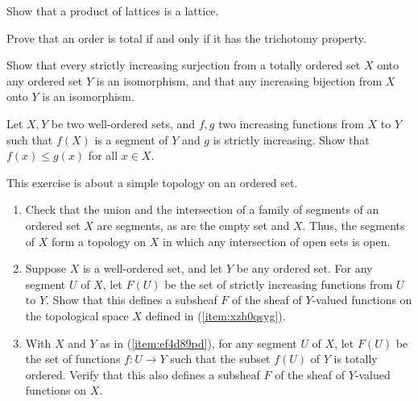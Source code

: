 \documentclass{article}
\begin{document}
\begin{exercise}
  \label{exe:yowl3axc}
  Show that a product of lattices is a lattice.
\end{exercise}

\begin{exercise}
  \label{exe:4knqif5b}
  Prove that an order is total if and only if it has the trichotomy
  property.
\end{exercise}

\begin{exercise}
  \label{exe:v1tw1ijd}
  Show that every strictly increasing surjection from a totally
  ordered set \(X\) onto any ordered set \(Y\) is an isomorphism, and
  that any increasing bijection from \(X\) onto \(Y\) is an
  isomorphism.
\end{exercise}

\begin{exercise}
  \label{exe:gsdhavsp}
  Let \(X, Y\) be two well-ordered sets, and \(f, g\) two increasing
  functions from \(X\) to \(Y\) such that \(f(X)\) is a segment of
  \(Y\) and \(g\) is strictly increasing.  Show that
  \(f(x) \leq g(x)\) for all \(x \in X\).
\end{exercise}

\begin{exercise}
  \label{exe:rpm18mof}
  This exercise is about a simple topology on an ordered set.
  \begin{enumerate}
  \item \label{item:xzh0qsyg} Check that the union and the
    intersection of a family of segments of an ordered set \(X\) are
    segments, as are the empty set and \(X\).  Thus, the segments of
    \(X\) form a topology on \(X\) in which any intersection of open
    sets is open.
  \item \label{item:ef4d89pd} Suppose \(X\) is a well-ordered set, and
    let \(Y\) be any ordered set.  For any segment \(U\) of \(X\), let
    \(F(U)\) be the set of strictly increasing functions from \(U\) to
    \(Y\).  Show that this defines a subsheaf \(F\) of the sheaf of
    \(Y\)-valued functions on the topological space \(X\) defined in
    (\ref{item:xzh0qsyg}).
  \item With \(X\) and \(Y\) as in (\ref{item:ef4d89pd}), for any
    segment \(U\) of \(X\), let \(F(U)\) be the set of functions
    \(f : U \to Y\) such that the subset \(f(U)\) of \(Y\) is totally
    ordered.  Verify that this also defines a subsheaf \(F\) of the
    sheaf of \(Y\)-valued functions on \(X\).
  \end{enumerate}
\end{exercise}
\end{document}
